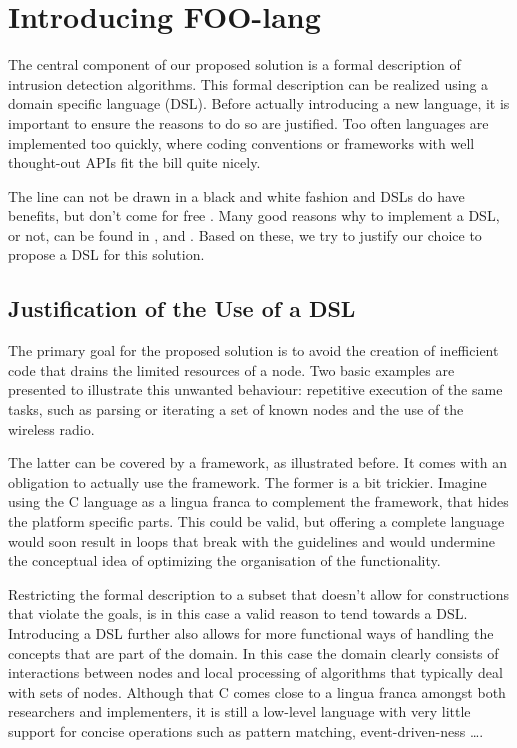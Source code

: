 \documentclass[conference]{IEEEtran}
\begin{document}
\section{Introducing FOO-lang}
\label{section:foo-lang}

The central component of our proposed solution is a formal description of
intrusion detection algorithms. This formal description can be realized using a
domain specific language (DSL). Before actually introducing a new language, it
is important to ensure the reasons to do so are justified. Too often languages
are implemented too quickly, where coding conventions or frameworks with well
thought-out APIs fit the bill quite nicely.

The line can not be drawn in a black and white fashion and DSLs do have
benefits, but don't come for free \cite{mernik2005and}. Many good reasons why
to implement a DSL, or not, can be found in \cite{mernik2005and},
\cite{van2000domain} and \cite{fowler2010domain}. Based on these, we try to
justify our choice to propose a DSL for this solution.

\subsection{Justification of the Use of a DSL}
\label{subsection:justification}

The primary goal for the proposed solution is to avoid the creation of
inefficient code that drains the limited resources of a node. Two basic
examples are presented to illustrate this unwanted behaviour: repetitive
execution of the same tasks, such as parsing or iterating a set of known nodes
and the use of the wireless radio.

The latter can be covered by a framework, as illustrated before. It comes with
an obligation to actually use the framework. The former is a bit trickier.
Imagine using the C language as a lingua franca to complement the framework,
that hides the platform specific parts. This could be valid, but offering a
complete language would soon result in loops that break with the guidelines and
would undermine the conceptual idea of optimizing the organisation of the
functionality.

Restricting the formal description to a subset that doesn't allow for
constructions that violate the goals, is in this case a valid reason to tend
towards a DSL. Introducing a DSL further also allows for more functional ways
of handling the concepts that are part of the domain. In this case the domain
clearly consists of interactions between nodes and local processing of
algorithms that typically deal with sets of nodes. Although that C comes close
to a lingua franca amongst both researchers and implementers, it is still a
low-level language with very little support for concise operations such as
pattern matching, event-driven-ness \dots.
\end{document}
